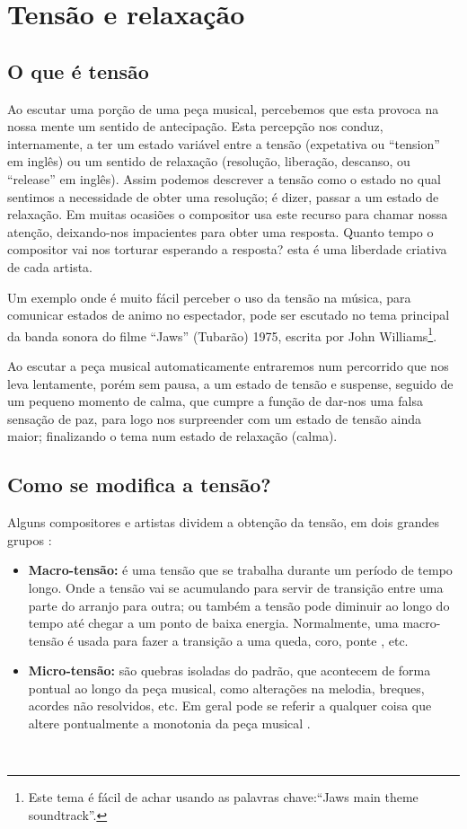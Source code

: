 \section{Tensão e relaxação }
\label{sec:tensionrelease}

\subsection{O que é tensão}
Ao escutar uma porção de uma peça musical, percebemos que esta provoca na nossa mente
um sentido de antecipação.
Esta percepção nos conduz, internamente, 
a ter um estado variável entre a tensão (expetativa ou ``tension'' em inglês)
ou um sentido de relaxação (resolução, liberação, descanso, ou ``release'' em inglês).
Assim podemos descrever a tensão como o 
estado no qual sentimos a necessidade de obter uma resolução; é dizer, passar a um estado de relaxação.
Em muitas ocasiões o compositor usa este recurso para chamar nossa atenção,
deixando-nos impacientes para obter uma resposta. 
Quanto tempo o compositor vai nos torturar esperando a resposta? 
esta é uma liberdade criativa de cada artista.

\begin{example}
Um exemplo onde é muito fácil perceber o uso da tensão na música, 
para comunicar estados de animo no espectador, 
pode ser escutado no tema principal da banda sonora do filme ``Jaws'' (Tubarão) 1975,
escrita por John Williams\footnote{Este tema é fácil de achar usando as palavras chave:``Jaws main theme soundtrack''.}.

Ao escutar a peça musical automaticamente entraremos num percorrido que nos leva lentamente,
porém sem pausa, a um estado de tensão e suspense, seguido de um pequeno momento de calma,
que cumpre a função de dar-nos uma falsa sensação de paz,
 para logo nos surpreender com um estado de tensão ainda maior;
finalizando o tema num estado de relaxação (calma).
\end{example}

\subsection{Como se modifica a tensão?}

Alguns compositores e artistas dividem a obtenção da tensão, em dois grandes grupos \cite{edmtensionrelease1}:
\begin{itemize}
\item \textbf{Macro-tensão:}
é uma tensão que se trabalha durante um período de tempo longo. 
Onde a tensão vai se acumulando para servir de transição entre uma parte do arranjo para outra;
ou também a tensão pode diminuir ao longo do tempo até chegar a um ponto de baixa energia.
Normalmente, uma macro-tensão é usada para fazer a transição a uma queda, coro, ponte \cite{edmtensionrelease1}, etc.
\item \textbf{Micro-tensão:}
são  quebras isoladas do padrão, que acontecem de forma pontual ao longo da peça musical, 
como alterações na melodia, breques, acordes não resolvidos, etc. 
Em geral pode se referir a qualquer coisa que altere pontualmente a monotonia da peça musical \cite{edmtensionrelease1}.
\end{itemize}~

